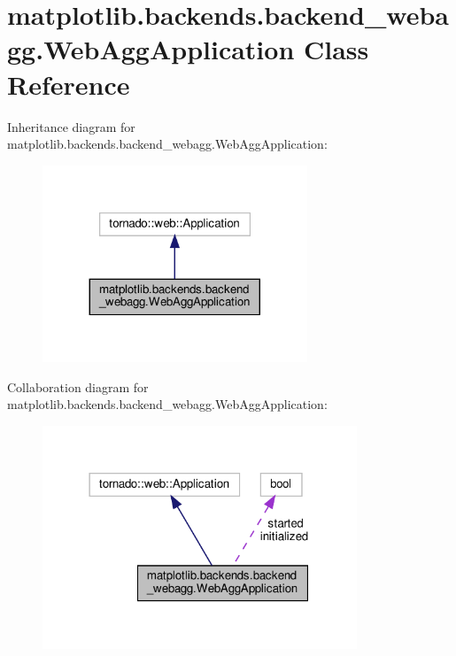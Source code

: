 \hypertarget{classmatplotlib_1_1backends_1_1backend__webagg_1_1WebAggApplication}{}\section{matplotlib.\+backends.\+backend\+\_\+webagg.\+Web\+Agg\+Application Class Reference}
\label{classmatplotlib_1_1backends_1_1backend__webagg_1_1WebAggApplication}


Inheritance diagram for matplotlib.\+backends.\+backend\+\_\+webagg.\+Web\+Agg\+Application\+:
\nopagebreak
\begin{figure}[H]
\begin{center}
\leavevmode
\includegraphics[width=224pt]{classmatplotlib_1_1backends_1_1backend__webagg_1_1WebAggApplication__inherit__graph}
\end{center}
\end{figure}


Collaboration diagram for matplotlib.\+backends.\+backend\+\_\+webagg.\+Web\+Agg\+Application\+:
\nopagebreak
\begin{figure}[H]
\begin{center}
\leavevmode
\includegraphics[width=266pt]{classmatplotlib_1_1backends_1_1backend__webagg_1_1WebAggApplication__coll__graph}
\end{center}
\end{figure}
